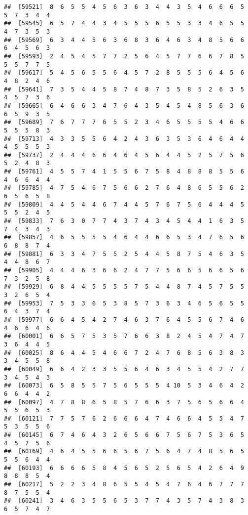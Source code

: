 \documentclass[
]{book}
\begin{document}
\begin{verbatim}
##  [59521]  8  6  5  5  4  5  6  3  6  3  4  4  3  5  4  6  6  6  5  5  7  3  4  4
##  [59545]  6  5  7  4  4  3  4  5  5  5  6  5  5  3  3  4  6  5  5  4  7  3  5  3
##  [59569]  6  3  4  4  5  6  3  6  8  3  6  4  6  3  4  8  5  6  6  6  4  5  6  3
##  [59593]  2  4  5  4  5  7  7  2  5  6  4  5  7  7  6  6  7  8  5  5  5  7  7  5
##  [59617]  5  4  5  6  5  5  6  4  5  7  2  8  5  5  5  6  4  5  6  4  8  2  4  6
##  [59641]  7  3  5  4  4  5  8  7  4  8  7  3  5  8  5  2  6  3  5  4  5  7  3  6
##  [59665]  6  4  6  6  3  4  7  6  4  3  5  4  5  4  8  5  6  3  6  6  5  9  3  5
##  [59689]  7  6  7  7  7  6  5  5  2  3  4  6  5  5  5  5  4  6  6  5  5  5  8  3
##  [59713]  4  3  3  5  5  6  4  2  4  3  6  3  5  3  6  4  6  4  4  4  5  5  5  3
##  [59737]  2  4  4  4  6  6  4  6  4  5  6  4  4  5  2  5  7  5  6  5  2  4  8  3
##  [59761]  4  5  5  7  4  1  5  5  6  7  5  8  4  8  8  8  5  5  6  4  6  6  4  4
##  [59785]  4  7  5  4  6  7  5  6  6  2  7  6  4  8  6  5  5  6  2  6  5  6  5  8
##  [59809]  4  4  5  4  4  6  7  4  4  5  7  6  7  5  6  4  4  4  5  5  5  2  4  5
##  [59833]  7  6  3  0  7  7  4  3  7  4  3  4  5  4  4  1  6  3  5  7  4  3  4  3
##  [59857]  4  6  5  5  5  5  4  6  4  4  6  6  5  3  4  7  6  5  6  6  8  8  7  4
##  [59881]  6  3  3  4  7  5  5  2  5  4  4  5  8  7  5  4  6  3  5  4  4  8  6  7
##  [59905]  4  4  4  6  3  6  6  2  4  7  7  5  6  6  5  6  6  5  6  7  3  2  5  8
##  [59929]  6  8  4  4  5  5  5  5  7  5  4  4  8  7  4  5  7  5  5  3  2  6  5  4
##  [59953]  7  5  3  3  6  5  3  8  5  7  3  6  3  4  6  5  6  5  5  6  4  3  7  4
##  [59977]  6  6  4  5  4  2  7  4  6  3  7  6  4  5  5  6  7  4  6  4  6  6  4  6
##  [60001]  6  6  5  7  5  3  5  7  6  6  3  8  2  4  5  4  7  4  7  3  6  4  4  5
##  [60025]  8  6  4  4  5  4  6  6  7  2  4  7  6  8  5  6  3  8  3  3  4  5  5  8
##  [60049]  6  6  4  2  3  3  5  5  6  4  6  3  4  5  5  4  2  7  7  3  4  5  4  3
##  [60073]  6  5  8  5  5  7  5  6  5  5  5  4 10  5  3  4  6  4  2  6  6  4  4  2
##  [60097]  4  7  8  8  6  5  8  5  7  6  6  3  7  5  6  5  6  6  4  5  5  6  5  3
##  [60121]  7  7  5  7  6  2  6  6  6  4  7  4  6  6  4  5  5  4  7  5  3  5  5  6
##  [60145]  6  7  4  6  4  3  2  6  5  6  6  7  5  6  7  5  3  6  5  4  5  7  5  6
##  [60169]  4  6  4  5  5  6  6  5  6  7  5  6  4  7  4  8  5  6  5  5  5  6  4  4
##  [60193]  6  6  6  6  5  8  4  5  6  5  2  5  6  5  4  2  6  4  9  8  8  8  5  4
##  [60217]  5  2  2  3  4  8  6  5  5  4  5  4  7  6  4  6  7  7  7  8  7  5  5  4
##  [60241]  3  4  6  3  5  5  6  5  3  7  7  4  3  5  7  4  3  8  3  6  5  7  4  7

\end{verbatim}
\end{document}
